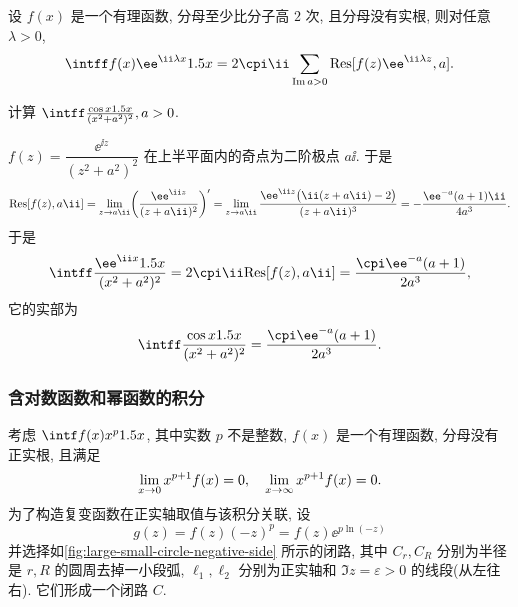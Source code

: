 \begin{theorem}
  \label{thm:rational-integral-exp-infinity}
  设 $f(x)$ 是一个有理函数, 分母至少比分子高 $2$ 次, 且分母没有实根, 则对任意 $\lambda>0$,
  \[
     \intff f(x)\ee^{\ii \lambda x}\d x
    =2\cpi\ii\sum_{\Im a>0}\Res[f(z)\ee^{\ii \lambda z},a].
  \]
\end{theorem}

\begin{example}
  计算 $\intff \frac{\cos x\d x}{(x^2+a^2)^2}, a>0$.
\end{example}

\begin{solution}
  $f(z)=\dfrac{\ee^{\ii z}}{(z^2+a^2)^2}$ 在上半平面内的奇点为二阶极点 $a\ii$.
  于是
  \[
     \Res[f(z),a\ii]
    =\lim_{z\ra a\ii}\biggl(\frac{\ee^{\ii z}}{(z+a\ii)^2}\biggr)'
    =\lim_{z\ra a\ii}\frac{\ee^{\ii z}\bigl(\ii(z+a\ii)-2\bigr)}{(z+a\ii)^3}
    =-\frac{\ee^{-a}(a+1)\ii}{4a^3}.
  \]
  于是
  \[
     \intff \frac{\ee^{\ii x}\d x}{(x^2+a^2)^2}
    =2\cpi\ii \Res[f(z),a\ii]=\frac{\cpi \ee^{-a}(a+1)}{2a^3},
  \]
  它的实部为
  \[
     \intff \frac{\cos x\d x}{(x^2+a^2)^2}
    =\frac{\cpi \ee^{-a}(a+1)}{2a^3}.
  \]
\end{solution}


\subsubsection{含对数函数和幂函数的积分}

考虑 $\intf f(x)x^p\d x$, 其中实数 $p$ 不是整数, $f(x)$ 是一个有理函数, 分母没有正实根, 且满足
\[
  \lim_{x\rightarrow 0} x^{p+1}f(x)=0,\quad
  \lim_{x\rightarrow \infty} x^{p+1}f(x)=0.
\]
为了构造复变函数在正实轴取值与该积分关联, 设
\[
  g(z)=f(z)(-z)^p=f(z)\ee^{p\ln(-z)}
\]
并选择如\ref{fig:large-small-circle-negative-side} 所示的闭路, 其中 $C_r,C_R$ 分别为半径是 $r,R$ 的圆周去掉一小段弧, $\ell_1,\ell_2$ 分别为正实轴和 $\Im z=\varepsilon>0$ 的线段(从左往右).
它们形成一个闭路 $C$.

